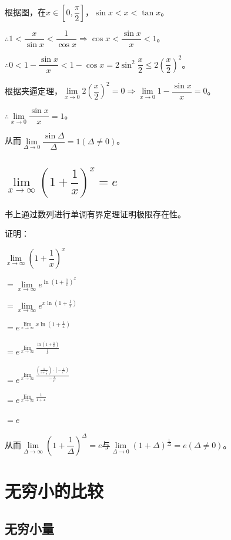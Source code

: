 \documentclass[UTF8, 12pt]{ctexart}
\begin{document}
    根据图，在$x\in[0,\dfrac{\pi}{2}]$，$\sin x<x<\tan x$。

    $\therefore 1<\dfrac{x}{\sin x}<\dfrac{1}{\cos x}\Rightarrow\cos x<\dfrac{\sin x}{x}<1$。

    $\therefore 0<1-\dfrac{\sin x}{x}<1-\cos x=2\sin^2\dfrac{x}{2}\leqslant 2\left(\dfrac{x}{2}\right)^2$。

    根据夹逼定理，$\lim\limits_{x\to 0}2\left(\dfrac{x}{2}\right)^2=0\Rightarrow\lim\limits_{x\to 0}1-\dfrac{\sin x}{x}=0$。

    $\therefore\lim\limits_{x\to 0}\dfrac{\sin x}{x}=1$。

    从而$\lim\limits_{\Delta\to 0}\dfrac{\sin\Delta}{\Delta}=1(\Delta\neq 0)$。

    \subsection{\texorpdfstring{$\lim\limits_{x\to\infty}\left(1+\dfrac{1}{x}\right)^x=e$}{}}

    书上通过数列进行单调有界定理证明极限存在性。

    证明：

    $\lim\limits_{x\to\infty}\left(1+\dfrac{1}{x}\right)^x$\medskip

    $=\lim\limits_{x\to\infty}e^{\ln(1+\frac{1}{x})^x}$

    $=\lim\limits_{x\to\infty}e^{x\ln(1+\frac{1}{x})}$

    $=e^{\lim\limits_{x\to\infty}x\ln(1+\frac{1}{x})}$

    $=e^{\lim\limits_{x\to\infty}\frac{\ln(1+\frac{1}{x})}{\frac{1}{x}}}$

    $=e^{\lim\limits_{x\to\infty}\frac{\left(\frac{1}{1+\frac{1}{x}}\right)\cdot\left(-\frac{1}{x^2}\right)}{-\frac{1}{x^2}}}$

    $=e^{\lim\limits_{x\to\infty}\frac{1}{1+x}}$

    $=e$

    从而$\lim\limits_{\Delta\to\infty}\left(1+\dfrac{1}{\Delta}\right)^\Delta=e$与$\lim\limits_{\Delta\to 0}\left(1+\Delta\right)^{\frac{1}{\Delta}}=e(\Delta\neq 0)$。


    \section{无穷小的比较}

    \subsection{无穷小量}
\end{document}
